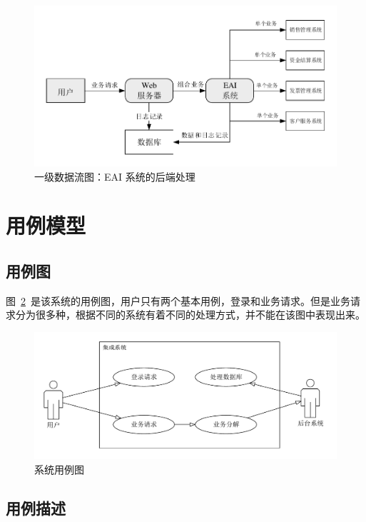 \documentclass[cs4size,a4paper,nofonts]{ctexart}
\begin{document}
\begin{figure}[htp]
\includegraphics[width=\textwidth,page=3]{images/dfd.pdf}
\caption{\label{dfd1.2}一级数据流图：EAI 系统的后端处理}
\end{figure}

\section{用例模型}

\subsection{用例图}

图~\ref{uc1}~是该系统的用例图，用户只有两个基本用例，登录和业务请求。但是业务请求分为很多种，根据不同的系统有着不同的处理方式，并不能在该图中表现出来。

\begin{figure}[htp]
\includegraphics[width=\textwidth,page=1]{images/ucs.pdf}
\caption{\label{uc1}系统用例图}
\end{figure}

\subsection{用例描述}
\end{document}
